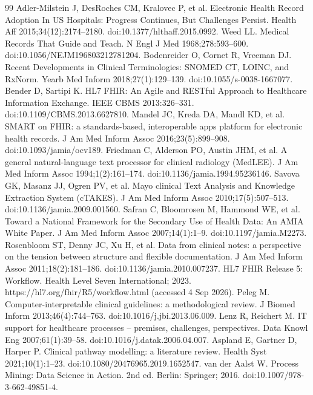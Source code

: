 \begin{thebibliography}{99}
\label{r14} Adler-Milstein J, DesRoches CM, Kralovec P, et al. Electronic Health Record Adoption In US Hospitals: Progress Continues, But Challenges Persist. Health Aff 2015;34(12):2174--2180. doi:10.1377/hlthaff.2015.0992.
\label{r15} Weed LL. Medical Records That Guide and Teach. N Engl J Med 1968;278:593--600. doi:10.1056/NEJM196803212781204.
\label{r16} Bodenreider O, Cornet R, Vreeman DJ. Recent Developments in Clinical Terminologies: SNOMED CT, LOINC, and RxNorm. Yearb Med Inform 2018;27(1):129--139. doi:10.1055/s-0038-1667077.
\label{r17} Bender D, Sartipi K. HL7 FHIR: An Agile and RESTful Approach to Healthcare Information Exchange. IEEE CBMS 2013:326--331. doi:10.1109/CBMS.2013.6627810.
\label{r18} Mandel JC, Kreda DA, Mandl KD, et al. SMART on FHIR: a standards-based, interoperable apps platform for electronic health records. J Am Med Inform Assoc 2016;23(5):899--908. doi:10.1093/jamia/ocv189.
\label{r19} Friedman C, Alderson PO, Austin JHM, et al. A general natural-language text processor for clinical radiology (MedLEE). J Am Med Inform Assoc 1994;1(2):161--174. doi:10.1136/jamia.1994.95236146.
\label{r20} Savova GK, Masanz JJ, Ogren PV, et al. Mayo clinical Text Analysis and Knowledge Extraction System (cTAKES). J Am Med Inform Assoc 2010;17(5):507--513. doi:10.1136/jamia.2009.001560.
\label{r21} Safran C, Bloomrosen M, Hammond WE, et al. Toward a National Framework for the Secondary Use of Health Data: An AMIA White Paper. J Am Med Inform Assoc 2007;14(1):1--9. doi:10.1197/jamia.M2273.
\label{r22} Rosenbloom ST, Denny JC, Xu H, et al. Data from clinical notes: a perspective on the tension between structure and flexible documentation. J Am Med Inform Assoc 2011;18(2):181--186. doi:10.1136/jamia.2010.007237.
\label{r23} HL7 FHIR Release 5: Workflow. Health Level Seven International; 2023. https://hl7.org/fhir/R5/workflow.html (accessed 4 Sep 2026).
\label{r24} Peleg M. Computer-interpretable clinical guidelines: a methodological review. J Biomed Inform 2013;46(4):744--763. doi:10.1016/j.jbi.2013.06.009.
\label{r25} Lenz R, Reichert M. IT support for healthcare processes -- premises, challenges, perspectives. Data Knowl Eng 2007;61(1):39--58. doi:10.1016/j.datak.2006.04.007.
\label{r26} Aspland E, Gartner D, Harper P. Clinical pathway modelling: a literature review. Health Syst 2021;10(1):1--23. doi:10.1080/20476965.2019.1652547.
\label{r27} van der Aalst W. Process Mining: Data Science in Action. 2nd ed. Berlin: Springer; 2016. doi:10.1007/978-3-662-49851-4.

\end{thebibliography}

